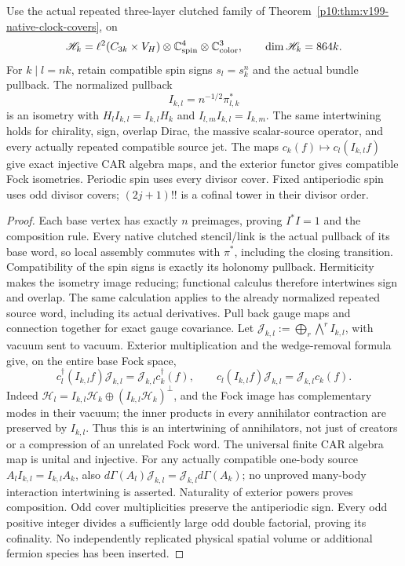 \documentclass[12pt,a4paper]{article}
\begin{document}
\begin{proposition}
\label{p10:prop:v2189-native-clock-car}
Use the actual repeated three-layer clutched family of
Theorem~\ref{p10:thm:v199-native-clock-covers}, on
\[
 \mathscr H_k=\ell^2(C_{3k}\times V_H)
       \otimes\mathbb C^4_{\rm spin}\otimes\mathbb C^3_{\rm color},
 \qquad \dim\mathscr H_k=864k.
\]
For $k\mid l=nk$, retain compatible spin signs $s_l=s_k^n$ and the
actual bundle pullback. The normalized pullback
\[
 I_{k,l}=n^{-1/2}\pi_{l,k}^*
\]
is an isometry with $H_lI_{k,l}=I_{k,l}H_k$ and
$I_{l,m}I_{k,l}=I_{k,m}$. The same intertwining holds for chirality,
sign, overlap Dirac, the massive scalar-source operator, and every
actually repeated compatible source jet. The maps
$c_k(f)\mapsto c_l(I_{k,l}f)$ give exact injective CAR algebra maps,
and the exterior functor gives compatible Fock isometries.
Periodic spin uses every divisor cover. Fixed antiperiodic spin uses
odd divisor covers; $(2j+1)!!$ is a cofinal tower in their divisor order.
\end{proposition}
\begin{proof}
Each base vertex has exactly $n$ preimages, proving $I^*I=1$ and the
composition rule. Every native clutched stencil/link is the actual pullback
of its base word, so local assembly commutes with $\pi^*$, including the
closing transition. Compatibility of the spin signs is exactly its
holonomy pullback. Hermiticity makes the isometry image reducing;
functional calculus therefore intertwines sign and overlap. The
same calculation applies to the already normalized repeated source word,
including its actual derivatives. Pull back gauge maps and connection
together for exact gauge covariance.
Let $\mathcal J_{k,l}:=\bigoplus_r\bigwedge^r I_{k,l}$, with vacuum sent
to vacuum. Exterior multiplication and the wedge-removal formula give,
on the entire base Fock space,
\[
 c_l^\dagger(I_{k,l}f)\mathcal J_{k,l}
 =\mathcal J_{k,l}c_k^\dagger(f),\qquad
 c_l(I_{k,l}f)\mathcal J_{k,l}
 =\mathcal J_{k,l}c_k(f).
\]
Indeed $\mathscr H_l=I_{k,l}\mathscr H_k\oplus(I_{k,l}\mathscr H_k)^\perp$,
and the Fock image has complementary modes in their vacuum; the inner
products in every annihilator contraction are preserved by $I_{k,l}$.
Thus this is an intertwining of annihilators, not just of creators or a
compression of an unrelated Fock word. The universal finite CAR algebra
map is unital and injective. For any actually compatible one-body source
$A_l I_{k,l}=I_{k,l}A_k$, also
$d\Gamma(A_l)\mathcal J_{k,l}=\mathcal J_{k,l}d\Gamma(A_k)$;
no unproved many-body interaction intertwining is asserted.
Naturality of exterior powers proves composition. Odd cover multiplicities preserve the
antiperiodic sign. Every odd positive integer divides a sufficiently large
odd double factorial, proving its cofinality. No independently replicated
physical spatial volume or additional fermion species has been inserted.
\end{proof}
\end{document}
